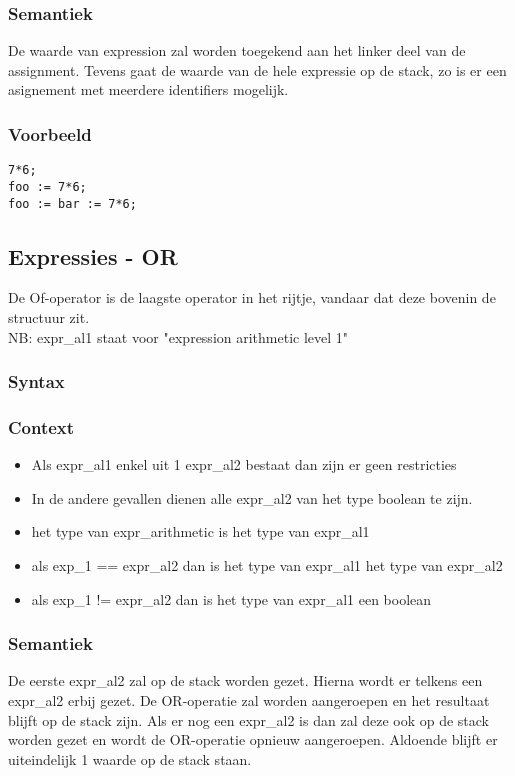 \documentclass[]{article}
\begin{document}
\subsubsection{Semantiek}
De waarde van expression zal worden toegekend aan het linker deel van de assignment.
Tevens gaat de waarde van de hele expressie op de stack, zo is er een asignement met meerdere identifiers mogelijk.
\subsubsection{Voorbeeld}
\begin{lstlisting}[style=SELMA]
7*6;
foo := 7*6;
foo := bar := 7*6;
\end{lstlisting}

\subsection{Expressies - OR}
De Of-operator is de laagste operator in het rijtje, vandaar dat deze bovenin de structuur zit.
\\
NB: expr\_al1 staat voor "expression arithmetic level 1"
\subsubsection{Syntax}

\subsubsection{Context}
\begin{itemize}
\item Als expr\_al1 enkel uit 1 expr\_al2 bestaat dan zijn er geen restricties
\item In de andere gevallen dienen alle expr\_al2 van het type boolean te zijn.
\item het type van expr\_arithmetic is het type van expr\_al1
\item als exp\_1 == expr\_al2 dan is het type van expr\_al1 het type van expr\_al2
\item als exp\_1 != expr\_al2 dan is het type van expr\_al1 een boolean
\end{itemize}
\subsubsection{Semantiek}
De eerste expr\_al2 zal op de stack worden gezet. Hierna wordt er telkens een expr\_al2 erbij gezet. De OR-operatie zal worden aangeroepen en het resultaat blijft op de stack zijn. Als er nog een expr\_al2 is dan zal deze ook op de stack worden gezet en wordt de OR-operatie opnieuw aangeroepen. Aldoende blijft er uiteindelijk 1 waarde op de stack staan.
\end{document}
